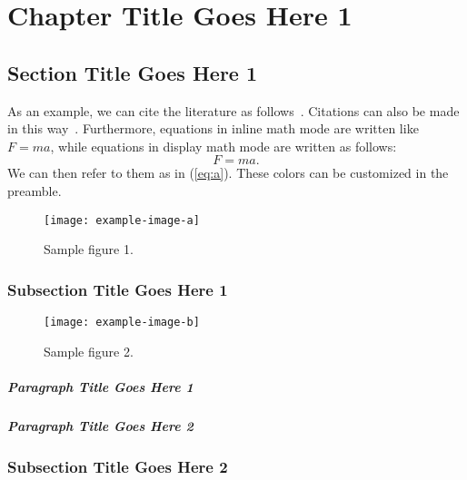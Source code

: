 \chapter{Chapter Title Goes Here 1}

\section{Section Title Goes Here 1}
As an example, we can cite the literature as follows~\cite{article-minimal,inbook-minimal}. Citations can also be made in this way~\cite{book-minimal,booklet-minimal,incollection-minimal}. Furthermore, equations in inline math mode are written like $F = ma$, while equations in display math mode are written as follows:
\begin{equation}
  \label{eq:a}
  F = ma.
\end{equation}
We can then refer to them as in (\ref{eq:a}). These colors can be customized in the preamble.

\lipsum[1-5]

\begin{figure}
  \centering
  \texttt{[image: example-image-a]}
  \caption{Sample figure 1.}
\end{figure}

\subsection{Subsection Title Goes Here 1}

\lipsum[6-9]

\begin{figure}
  \centering
  \texttt{[image: example-image-b]}
  \caption{Sample figure 2.}
\end{figure}

\paragraph{Paragraph Title Goes Here 1}

\lipsum[10]

\paragraph{Paragraph Title Goes Here 2}

\lipsum[11]

\subsection{Subsection Title Goes Here 2}

